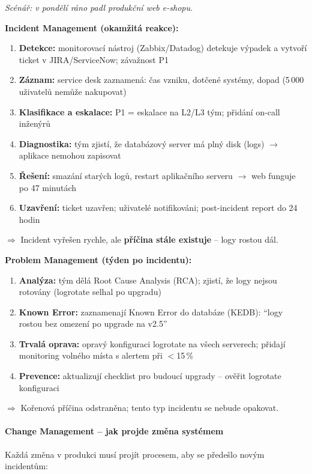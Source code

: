 \textit{Scénář: v pondělí ráno padl produkční web e-shopu.}

\textbf{Incident Management (okamžitá reakce):}
\begin{enumerate}
  \item \textbf{Detekce:} monitorovací nástroj (Zabbix/Datadog) detekuje výpadek a vytvoří ticket v JIRA/ServiceNow; závažnost P1
  \item \textbf{Záznam:} service desk zaznamená: čas vzniku, dotčené systémy, dopad (5\,000 uživatelů nemůže nakupovat)
  \item \textbf{Klasifikace a eskalace:} P1 = eskalace na L2/L3 tým; přidání on-call inženýrů
  \item \textbf{Diagnostika:} tým zjistí, že databázový server má plný disk (logs) $\to$ aplikace nemohou zapisovat
  \item \textbf{Řešení:} smazání starých logů, restart aplikačního serveru $\to$ web funguje po 47 minutách
  \item \textbf{Uzavření:} ticket uzavřen; uživatelé notifikováni; post-incident report do 24 hodin
\end{enumerate}
$\Rightarrow$ Incident vyřešen rychle, ale \textbf{příčina stále existuje} -- logy rostou dál.

\textbf{Problem Management (týden po incidentu):}
\begin{enumerate}
  \item \textbf{Analýza:} tým dělá Root Cause Analysis (RCA); zjistí, že logy nejsou rotovány (logrotate selhal po upgradu)
  \item \textbf{Known Error:} zaznamenají Known Error do databáze (KEDB): ``logy rostou bez omezení po upgrade na v2.5''
  \item \textbf{Trvalá oprava:} opravý konfiguraci logrotate na všech serverech; přidají monitoring volného místa s alertem při $<$15\,\%
  \item \textbf{Prevence:} aktualizují checklist pro budoucí upgrady -- ověřit logrotate konfiguraci
\end{enumerate}
$\Rightarrow$ Kořenová příčina odstraněna; tento typ incidentu se nebude opakovat.

\paragraph{Change Management -- jak projde změna systémem}

Každá změna v produkci musí projít procesem, aby se předešlo novým incidentům:

